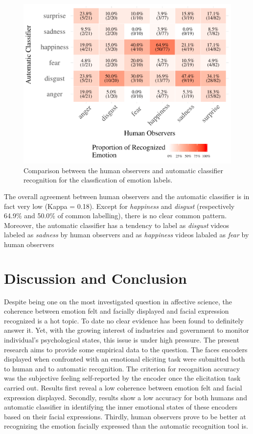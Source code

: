 \documentclass[conference,final,]{IEEEtran}
\makeatletter
\def\maxwidth{\ifdim\Gin@nat@width>\linewidth\linewidth
\else\Gin@nat@width\fi}
\let\Oldincludegraphics\includegraphics
\renewcommand{\includegraphics}[1]{\Oldincludegraphics[width=\maxwidth]{#1}}
\makeatother
\begin{document}
\begin{figure}
\centering
\includegraphics{ACII_2019_paper_files/figure-latex/confusionMatrix_hr_ar-1.pdf}
\caption{\label{fig:confusionMatrix_hr_ar}Comparison between the human
observers and automatic classifier recognition for the classfication of
emotion labels.}
\end{figure}

The overall agreement between human observers and the automatic
classifier is in fact very low (Kappa = 0.18). Except for
\emph{happiness} and \emph{disgust} (respectively 64.9\% and 50.0\% of
common labelling), there is no clear common pattern. Moreover, the
automatic classifier has a tendency to label as \emph{disgust} videos
labeled as \emph{sadness} by human observers and as \emph{happiness}
videos labaled as \emph{fear} by human observers

\hypertarget{discussion-and-conclusion}{%
\section{Discussion and Conclusion}\label{discussion-and-conclusion}}

Despite being one on the most investigated question in affective
science, the coherence between emotion felt and facially displayed and
facial expression recognized is a hot topic. To date no clear evidence
has been found to definitely answer it. Yet, with the growing interest
of industries and government to monitor individual's psychological
states, this issue is under high pressure. The present research aims to
provide some empirical data to the question. The faces encoders
displayed when confronted with an emotional eliciting task were
submitted both to human and to automatic recognition. The criterion for
recognition accuracy was the subjective feeling self-reported by the
encoder once the elicitation task carried out. Results first reveal a
low coherence between emotion felt and facial expression displayed.
Secondly, results show a low accuracy for both humans and automatic
classifier in identifying the inner emotional states of these encoders
based on their facial expressions. Thirdly, human observers prove to be
better at recognizing the emotion facially expressed than the automatic
recognition tool is.
\end{document}
